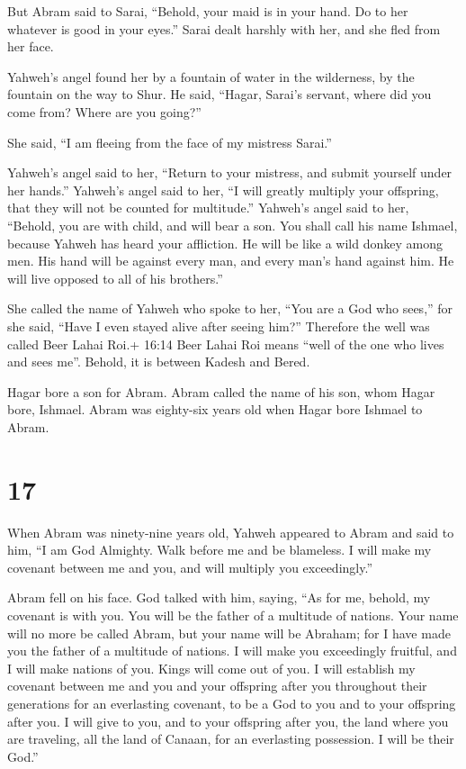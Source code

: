  But Abram said to Sarai, ``Behold, your maid is in your
hand. Do to her whatever is good in your eyes.'' Sarai dealt harshly
with her, and she fled from her face.

 Yahweh's angel found her by a fountain of water in the
wilderness, by the fountain on the way to Shur.  He said,
``Hagar, Sarai's servant, where did you come from? Where are you
going?''

She said, ``I am fleeing from the face of my mistress Sarai.''

 Yahweh's angel said to her, ``Return to your mistress, and
submit yourself under her hands.''  Yahweh's angel said to
her, ``I will greatly multiply your offspring, that they will not be
counted for multitude.''  Yahweh's angel said to her,
``Behold, you are with child, and will bear a son. You shall call his
name Ishmael, because Yahweh has heard your affliction.  He
will be like a wild donkey among men. His hand will be against every
man, and every man's hand against him. He will live opposed to all of
his brothers.''

 She called the name of Yahweh who spoke to her, ``You are
a God who sees,'' for she said, ``Have I even stayed alive after seeing
him?''  Therefore the well was called Beer Lahai Roi.+
16:14 Beer Lahai Roi means ``well of the one who lives and sees me''.
Behold, it is between Kadesh and Bered.

 Hagar bore a son for Abram. Abram called the name of his
son, whom Hagar bore, Ishmael.  Abram was eighty-six years
old when Hagar bore Ishmael to Abram.

\hypertarget{section-16}{%
\section{17}\label{section-16}}

 When Abram was ninety-nine years old, Yahweh appeared to
Abram and said to him, ``I am God Almighty. Walk before me and be
blameless.  I will make my covenant between me and you, and
will multiply you exceedingly.''

 Abram fell on his face. God talked with him, saying,
 ``As for me, behold, my covenant is with you. You will be
the father of a multitude of nations.  Your name will no
more be called Abram, but your name will be Abraham; for I have made you
the father of a multitude of nations.  I will make you
exceedingly fruitful, and I will make nations of you. Kings will come
out of you.  I will establish my covenant between me and you
and your offspring after you throughout their generations for an
everlasting covenant, to be a God to you and to your offspring after
you.  I will give to you, and to your offspring after you,
the land where you are traveling, all the land of Canaan, for an
everlasting possession. I will be their God.''

